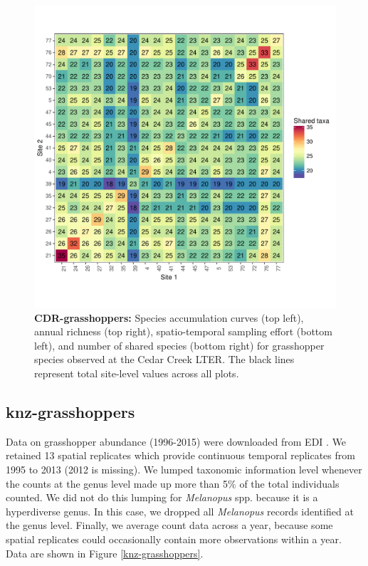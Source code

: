 \documentclass[11pt, oneside]{article}
\begin{document}
\begin{figure}[h!]
\includegraphics[scale = 0.4]{cdr-grasshopper-compagnoni_spp_shared.pdf}
\caption{{\bf CDR-grasshoppers:} Species accumulation curves (top left),  annual richness (top right), spatio-temporal sampling effort (bottom left), and number of shared species (bottom right) for grasshopper species observed at the Cedar Creek LTER. The black lines represent total site-level values across all plots.}
\label{cdr-grasshoppers}
\end{figure}



\subsection{knz-grasshoppers}
Data on grasshopper abundance (1996-2015) were downloaded from  EDI \citep{knz-grasshoppers}.
We retained 13 spatial replicates which provide continuous temporal replicates from 1995 to 2013 (2012 is missing). 
We lumped taxonomic information level whenever the counts at the genus level made up more than 5$\%$ of the total individuals counted. 
We did not do this lumping for {\it Melanopus} spp. because it is a hyperdiverse genus. 
In this case, we dropped all {\it Melanopus} records identified at the genus level. 
Finally, we average count data across a year, because some spatial replicates could occasionally contain more observations within a year.
Data are shown in Figure \ref{knz-grasshoppers}.
\end{document}
